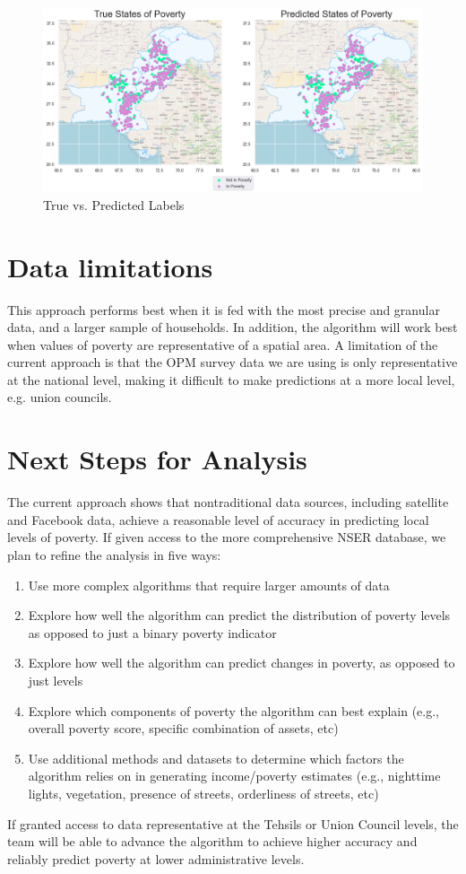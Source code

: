 \documentclass[8pt, oneside]{article}
\begin{document}
\begin{figure}[H]
\label{fig:map}
\centering
\includegraphics[width=1\textwidth]{Figures/map.png}
\caption{True vs. Predicted Labels}
\end{figure}

\newpage

\section*{Data limitations }

This approach performs best when it is fed with the most precise and granular data, and a larger sample of households. In addition, the algorithm will work best when values of poverty are representative of a spatial area. A limitation of the current approach is that the OPM survey data we are using is only representative at the national level, making it difficult to make predictions at a more local level, e.g. union councils.

\section*{Next Steps for Analysis}

The current approach shows that nontraditional data sources, including satellite and Facebook data, achieve a reasonable level of accuracy in predicting local levels of poverty. If given access to the more comprehensive NSER database, we plan to refine the analysis in five ways: 
\begin{enumerate}
\item Use more complex algorithms that require larger amounts of data
\item Explore how well the algorithm can predict the distribution of poverty levels as opposed to just a binary poverty indicator
\item Explore how well the algorithm can predict changes in poverty, as opposed to just levels
\item Explore which components of poverty the algorithm can best explain (e.g., overall poverty score, specific combination of assets, etc)  
\item Use additional methods and datasets to determine which factors the algorithm relies on in generating income/poverty estimates (e.g., nighttime lights, vegetation, presence of streets, orderliness of streets, etc)
\end{enumerate}
 If granted access to data representative at the Tehsils or Union Council levels, the team will be able to advance the algorithm to achieve higher accuracy and reliably predict poverty at lower administrative levels.
\end{document}
